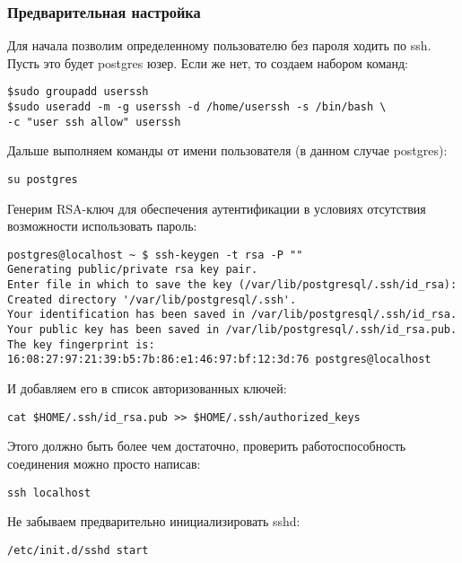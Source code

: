 \subsubsection{Предварительная настройка}
Для начала позволим определенному пользователю без пароля ходить по ssh. Пусть это будет postgres юзер. 
Если же нет, то создаем набором команд:
\begin{lstlisting}[label=lst:streaming1,caption=Создаем пользователя userssh]
$sudo groupadd userssh
$sudo useradd -m -g userssh -d /home/userssh -s /bin/bash \
-c "user ssh allow" userssh
\end{lstlisting}

Дальше выполняем команды от имени пользователя (в данном случае postgres):
\begin{lstlisting}[label=lst:streaming2,caption=Логинимся под пользователем postgres]
su postgres
\end{lstlisting}

Генерим RSA-ключ для обеспечения аутентификации в условиях отсутствия возможности использовать пароль:
\begin{lstlisting}[label=lst:streaming3,caption=Генерим RSA-ключ]
postgres@localhost ~ $ ssh-keygen -t rsa -P ""
Generating public/private rsa key pair.
Enter file in which to save the key (/var/lib/postgresql/.ssh/id_rsa): 
Created directory '/var/lib/postgresql/.ssh'.
Your identification has been saved in /var/lib/postgresql/.ssh/id_rsa.
Your public key has been saved in /var/lib/postgresql/.ssh/id_rsa.pub.
The key fingerprint is:
16:08:27:97:21:39:b5:7b:86:e1:46:97:bf:12:3d:76 postgres@localhost
\end{lstlisting}

И добавляем его в список авторизованных ключей:
\begin{lstlisting}[label=lst:streaming4,caption=Добавляем его в список авторизованных ключей]
cat $HOME/.ssh/id_rsa.pub >> $HOME/.ssh/authorized_keys
\end{lstlisting}

Этого должно быть более чем достаточно, проверить работоспособность соединения можно просто написав:
\begin{lstlisting}[label=lst:streaming5,caption=Пробуем зайти на ssh без пароля]
ssh localhost
\end{lstlisting}

Не забываем предварительно инициализировать sshd:
\begin{lstlisting}[label=lst:streaming6,caption=Запуск sshd]
/etc/init.d/sshd start
\end{lstlisting}


